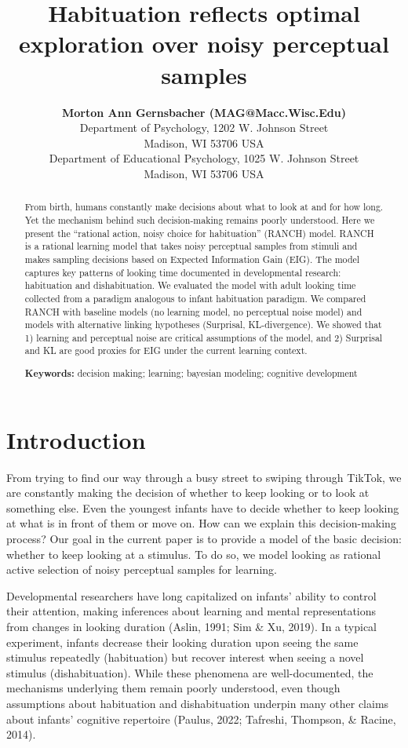 \documentclass[10pt, letterpaper]{article}
\title{Habituation reflects optimal exploration over noisy perceptual
samples}
\author{{\large \bf Morton Ann Gernsbacher (MAG@Macc.Wisc.Edu)} \\ Department of Psychology, 1202 W. Johnson Street \\ Madison, WI 53706 USA \AND {\large \bf Sharon J.~Derry (SDJ@Macc.Wisc.Edu)} \\ Department of Educational Psychology, 1025 W. Johnson Street \\ Madison, WI 53706 USA}
\begin{document}
\maketitle

\begin{abstract}
From birth, humans constantly make decisions about what to look at and
for how long. Yet the mechanism behind such decision-making remains
poorly understood. Here we present the ``rational action, noisy choice
for habituation'' (RANCH) model. RANCH is a rational learning model that
takes noisy perceptual samples from stimuli and makes sampling decisions
based on Expected Information Gain (EIG). The model captures key
patterns of looking time documented in developmental research:
habituation and dishabituation. We evaluated the model with adult
looking time collected from a paradigm analogous to infant habituation
paradigm. We compared RANCH with baseline models (no learning model, no
perceptual noise model) and models with alternative linking hypotheses
(Surprisal, KL-divergence). We showed that 1) learning and perceptual
noise are critical assumptions of the model, and 2) Surprisal and KL are
good proxies for EIG under the current learning context.

\textbf{Keywords:}
decision making; learning; bayesian modeling; cognitive development
\end{abstract}

\hypertarget{introduction}{%
\section{Introduction}\label{introduction}}

From trying to find our way through a busy street to swiping through
TikTok, we are constantly making the decision of whether to keep looking
or to look at something else. Even the youngest infants have to decide
whether to keep looking at what is in front of them or move on. How can
we explain this decision-making process? Our goal in the current paper
is to provide a model of the basic decision: whether to keep looking at
a stimulus. To do so, we model looking as rational active selection of
noisy perceptual samples for learning.

Developmental researchers have long capitalized on infants' ability to
control their attention, making inferences about learning and mental
representations from changes in looking duration (Aslin, 1991; Sim \&
Xu, 2019). In a typical experiment, infants decrease their looking
duration upon seeing the same stimulus repeatedly (habituation) but
recover interest when seeing a novel stimulus (dishabituation). While
these phenomena are well-documented, the mechanisms underlying them
remain poorly understood, even though assumptions about habituation and
dishabituation underpin many other claims about infants' cognitive
repertoire (Paulus, 2022; Tafreshi, Thompson, \& Racine, 2014).
\end{document}
